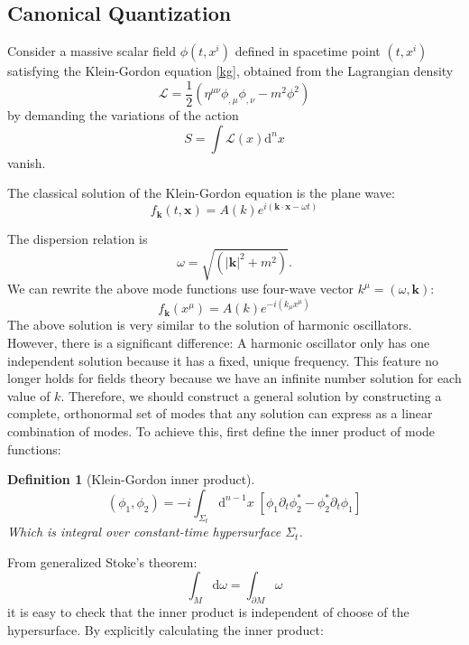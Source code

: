 \documentclass[12pt]{article}
\numberwithin{equation}{section}
\theoremstyle{1style}
\newtheorem{definition}[equation]{Definition}
\newcommand{\p}{\partial}
\newcommand{\id}{\mathrm{d}}
\begin{document}
\subsection{Canonical Quantization}
Consider a massive scalar field \(\phi(t,x^{i})\) defined in spacetime point \((t,x^{i})\) satisfying the Klein-Gordon equation \ref{kg},
obtained from the Lagrangian density
\[\mathcal{L} = \frac{1}{2}(\eta^{\mu\nu} \phi_{,\mu} \phi_{,\nu}- m^2 \phi^2)\]
by demanding the variations of the action \[S = \int \mathcal{L}(x) \mathrm{d}^{n}x\] vanish.
\par
The classical solution of the Klein-Gordon equation is the plane wave:
\[f_{\mathbf{k}}(t,\mathbf{x})=  A(k)e^{i(\mathbf{k}\cdot \mathbf{x}-\omega t)}\]

The dispersion relation is \[\omega = \sqrt{(\mathbf{|k|}^2 + m^2 )}.\]
We can rewrite the above mode functions use four-wave vector \(k^{\mu}=(\omega,\mathbf{k})\):
\begin{equation}\label{112}
  f_{\mathbf{k}}(x^{\mu})= A(k)e^{-i(k_\mu x^\mu)}
\end{equation}
The above solution is very similar to the solution of harmonic oscillators. However, there is a significant difference:
A harmonic oscillator only has one independent solution because it has a fixed, unique frequency.
This feature no longer holds for fields theory because we have an infinite number solution for each value of \(k\).
Therefore, we should construct a general solution by constructing a complete, orthonormal set of modes that any solution
can express as a linear combination of modes.
To achieve this, first define the inner product of mode functions:
\begin{definition}[Klein-Gordon inner product]\label{kgi}
  \[(\phi_1,\phi_2)=-i\int_{\Sigma_t}\id^{n-1}x\;\left[\phi_1\p_t\phi^*_2-\phi_2^*\p_t\phi_1\right]\]
  Which is integral over constant-time hypersurface \(\Sigma_t\).
\end{definition}
From generalized Stoke's theorem:\[\int_{M}\id\omega=\int_{\p M}\omega\]
\hfill \break
it is easy to check that the inner product is independent of choose of the hypersurface.
By explicitly calculating the inner product:
\end{document}
